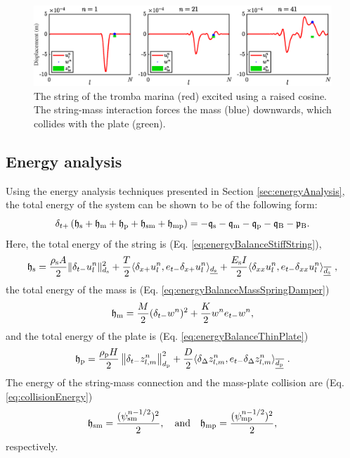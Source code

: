 \begin{figure}[h]
    \centering
    \includegraphics[width=\textwidth]{figures/contributions/tromba/trombaExcite.eps}
    \caption{The string of the tromba marina (red) excited using a raised cosine. The string-mass interaction forces the mass (blue) downwards, which collides with the plate (green). \label{fig:trombaExcite}}
\end{figure}

\subsection{Energy analysis}
Using the energy analysis techniques presented in Section \ref{sec:energyAnalysis}, the total energy of the system can be shown to be of the following form:
\begin{equation}
    \delta_{t+}\left(\mathfrak{h}_{\text{s}} + \mathfrak{h}_{\text{m}} + \mathfrak{h}_{\text{p}} + \mathfrak{h}_{\text{sm}} + \mathfrak{h}_{\text{mp}}\right) = -\mathfrak{q}_{\text{s}} - \mathfrak{q}_{\text{m}} - \mathfrak{q}_{\text{p}} - \mathfrak{q}_{\text{B}} - \mathfrak{p}_{\text{B}}.
\end{equation}
Here, the total energy of the string is (Eq. \eqref{eq:energyBalanceStiffString}),
\begin{equation*}
    \begin{gathered}
        \mathfrak{h}_{\text{s}} = \frac{\rho_{\text{s}} A}{2}\lVert\delta_{t-} u_l^n\rVert^2_{d_{\text{s}}} + \frac{T}{2}\langle\delta_{x+}u_l^n, e_{t-}\delta_{x+}u_l^n\rangle_{\underline{d_{\text{s}}}} + \frac{E_{\text{s}} I}{2}\langle\delta_{xx}u_l^n, e_{t-}\delta_{xx}u_l^n\rangle_{\overline{\underline{d_{\text{s}}}}}\ ,
    \end{gathered}
\end{equation*}
the total energy of the mass is (Eq. \eqref{eq:energyBalanceMassSpringDamper}) 
\begin{equation*}
    \mathfrak{h}_{\text{m}} = \frac{M}{2}(\delta_{t-} w^n)^2 + \frac{K}{2}w^n e_{t-}w^n,
\end{equation*}
and the total energy of the plate is (Eq. \eqref{eq:energyBalanceThinPlate})
\begin{equation*}
    \mathfrak{h}_{\text{p}} = \frac{\rho_{\text{p}} H}{2} \left\lVert\delta_{t-}z_{l,m}^n\right\rVert_{d_{\text{p}}}^2 + \frac{D}{2}\langle\delta_{\Delta} z_{l,m}^n, e_{t-}\delta_{\Delta} z_{l,m}^n\rangle_{\overline{\underline{d_{\text{p}}}}}\ .
\end{equation*}
The energy of the string-mass connection and the mass-plate collision are (Eq. \eqref{eq:collisionEnergy})
\begin{equation*}
    \mathfrak{h}_{\text{sm}} = \frac{(\psi_{\text{sm}}^{n-1/2})^2}{2}, \quad \text{and} \quad \mathfrak{h}_{\text{mp}} = \frac{(\psi_{\text{mp}}^{n-1/2})^2}{2},
\end{equation*}
respectively.

